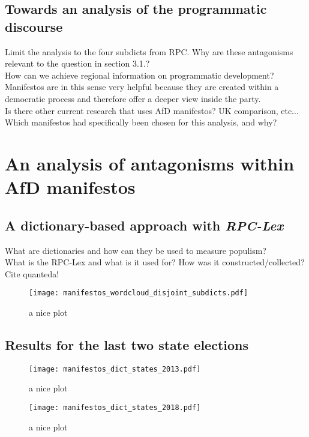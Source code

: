 \documentclass[a4paper]{scrreprt}
\begin{document}
\section{Towards an analysis of the programmatic discourse}
Limit the analysis to the four subdicts from RPC. Why are these antagonisms relevant to the question in section 3.1.?\\
How can we achieve regional information on programmatic development? Manifestos are in this sense very helpful because they are created within a democratic process and therefore offer a deeper view inside the party.\\
Is there other current research that uses AfD manifestos? UK comparison, etc...\\
Which manifestos had specifically been chosen for this analysis, and why?
\chapter{An analysis of antagonisms within AfD manifestos}
\section{A dictionary-based approach with \em RPC-Lex}
What are dictionaries and how can they be used to measure populism?\\
What is the RPC-Lex and what is it used for? How was it constructed/collected?\\
Cite quanteda!
\begin{figure}
    \centering
    \texttt{[image: manifestos\_wordcloud\_disjoint\_subdicts.pdf]}
    \caption{a nice plot}
\end{figure}
\section{Results for the last two state elections}
\begin{figure}
    \centering
    \texttt{[image: manifestos\_dict\_states\_2013.pdf]}
    \caption{a nice plot}
\end{figure}
\begin{figure}
    \centering
    \texttt{[image: manifestos\_dict\_states\_2018.pdf]}
    \caption{a nice plot}
\end{figure}
\end{document}
